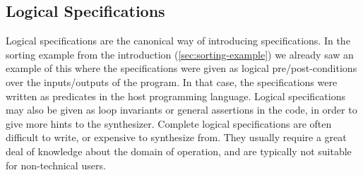 \subsection{Logical Specifications}
\label{sec:logical}

Logical specifications are the canonical way of introducing specifications. In
the sorting example from the introduction (\ref{sec:sorting-example}) we already
saw an example of this where the specifications were given as logical
pre/post-conditions over the inputs/outputs of the program. In that case, the
specifications were written as predicates in the host programming language.
Logical specifications may also be given as loop invariants or general
assertions in the code, in order to give more hints to the
synthesizer.
Complete logical specifications are often difficult to write, or expensive to
synthesize from.
They usually require a great deal of knowledge about the domain of operation,
and are typically not suitable for non-technical users.
